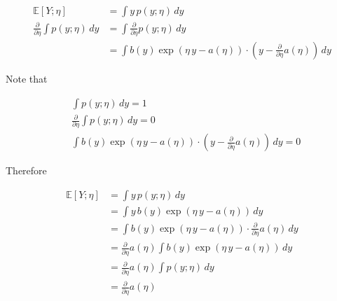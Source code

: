 \begin{answer}

\begin{align*}
    \mathbb{E}[Y;\eta] &= \int y\,p(y;\eta)\,dy \\
    \frac{\partial}{\partial\eta}\int p(y;\eta)\,dy &= \int \frac{\partial}{\partial\eta} p(y;\eta)\,dy \\
    &= \int b(y)\exp(\eta\,y - a(\eta))\cdot \left(y - \frac{\partial}{\partial\eta}a(\eta)\right)\,dy
\end{align*}

Note that

\begin{align*}
    &\int p(y;\eta)\,dy = 1 \\
    &\frac{\partial}{\partial\eta}\int p(y;\eta)\,dy = 0 \\
    &\int b(y)\exp(\eta\,y - a(\eta))\cdot \left(y - \frac{\partial}{\partial\eta}a(\eta)\right)\,dy = 0
\end{align*}

Therefore

\begin{align*}
    \mathbb{E}[Y;\eta] &= \int y\,p(y;\eta)\,dy \\
    &= \int y\,b(y)\exp(\eta\,y - a(\eta))\,dy \\
    &= \int b(y)\exp(\eta\,y - a(\eta))\cdot \frac{\partial}{\partial\eta}a(\eta)\,dy \\
    &= \frac{\partial}{\partial\eta}a(\eta) \int b(y)\exp(\eta\,y - a(\eta))\,dy \\
    &= \frac{\partial}{\partial\eta}a(\eta) \int p(y;\eta)\,dy \\
    &= \frac{\partial}{\partial\eta}a(\eta)
\end{align*}

\end{answer}

